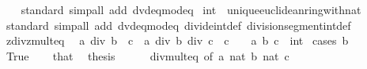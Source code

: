 \begin{isabellebody}
%
\isadelimproof
\ \ %
\endisadelimproof
%
\isatagproof
{}\isamarkupfalse%
\ standard\ {\isacharparenleft}{\kern0pt}simp{\isacharunderscore}{\kern0pt}all\ add{\isacharcolon}{\kern0pt}\ dvd{\isacharunderscore}{\kern0pt}eq{\isacharunderscore}{\kern0pt}mod{\isacharunderscore}{\kern0pt}eq{\isacharunderscore}{\kern0pt}{}{\isacharparenright}{\kern0pt}%
\endisatagproof
{\isafoldproof}%
%
\isadelimproof
\isanewline
%
\endisadelimproof
\isanewline
{}\isamarkupfalse%
\ int\ {\isacharcolon}{\kern0pt}{\isacharcolon}{\kern0pt}\ unique{\isacharunderscore}{\kern0pt}euclidean{\isacharunderscore}{\kern0pt}ring{\isacharunderscore}{\kern0pt}with{\isacharunderscore}{\kern0pt}nat\isanewline
%
\isadelimproof
\ \ %
\endisadelimproof
%
\isatagproof
{}\isamarkupfalse%
\ standard\ {\isacharparenleft}{\kern0pt}simp{\isacharunderscore}{\kern0pt}all\ add{\isacharcolon}{\kern0pt}\ dvd{\isacharunderscore}{\kern0pt}eq{\isacharunderscore}{\kern0pt}mod{\isacharunderscore}{\kern0pt}eq{\isacharunderscore}{\kern0pt}{}\ divide{\isacharunderscore}{\kern0pt}int{\isacharunderscore}{\kern0pt}def\ division{\isacharunderscore}{\kern0pt}segment{\isacharunderscore}{\kern0pt}int{\isacharunderscore}{\kern0pt}def{\isacharparenright}{\kern0pt}%
\endisatagproof
{\isafoldproof}%
%
\isadelimproof
\isanewline
%
\endisadelimproof
\isanewline
{}\isamarkupfalse%
\ zdiv{\isacharunderscore}{\kern0pt}zmult{}{\isacharunderscore}{\kern0pt}eq{\isacharcolon}{\kern0pt}\isanewline
\ \ {\isacartoucheopen}a\ div\ {\isacharparenleft}{\kern0pt}b\ {\isacharasterisk}{\kern0pt}\ c{\isacharparenright}{\kern0pt}\ {\isacharequal}{\kern0pt}\ {\isacharparenleft}{\kern0pt}a\ div\ b{\isacharparenright}{\kern0pt}\ div\ c{\isacartoucheclose}\ \ {\isacartoucheopen}c\ {\isasymge}\ {}{\isacartoucheclose}\ \ a\ b\ c\ {\isacharcolon}{\kern0pt}{\isacharcolon}{\kern0pt}\ int\isanewline
%
\isadelimproof
%
\endisadelimproof
%
\isatagproof
{}\isamarkupfalse%
\ {\isacharparenleft}{\kern0pt}cases\ {\isacartoucheopen}b\ {\isasymge}\ {}{\isacartoucheclose}{\isacharparenright}{\kern0pt}\isanewline
\ \ \isamarkupfalse%
\ True\isanewline
\ \ \isamarkupfalse%
\ that\ \isamarkupfalse%
\ {\isacharquery}{\kern0pt}thesis\isanewline
\ \ \ \ \isamarkupfalse%
\ div{\isacharunderscore}{\kern0pt}mult{}{\isacharunderscore}{\kern0pt}eq{\isacharprime}{\kern0pt}\ {\isacharbrackleft}{\kern0pt}of\ a\ {\isacartoucheopen}nat\ b{\isacartoucheclose}\ {\isacartoucheopen}nat\ c{\isacartoucheclose}{\isacharbrackright}{\kern0pt}\ \isamarkupfalse%

\end{isabellebody}
